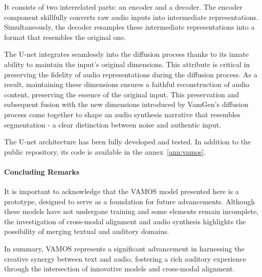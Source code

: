 It consists of two interrelated parts: an encoder and a decoder. The encoder component skillfully converts raw audio inputs into intermediate representations. Simultaneously, the decoder resamples these intermediate representations into a format that resembles the original one.

The U-net integrates seamlessly into the diffusion process thanks to its innate ability to maintain the input's original dimensions. This attribute is critical in preserving the fidelity of audio representations during the diffusion process. As a result, maintaining these dimensions ensures a faithful reconstruction of audio content, preserving the essence of the original input. This preservation and subsequent fusion with the new dimensions introduced by VamGen's diffusion process come together to shape an audio synthesis narrative that resembles segmentation - a clear distinction between noise and authentic input.

The U-net architecture has been fully developed and tested. In addition to the public repository, its code is available in the annex~\ref{ann:vamos}.

\paragraph{Concluding Remarks}

It is important to acknowledge that the VAMOS model presented here is a prototype, designed to serve as a foundation for future advancements. Although these models have not undergone training and some elements remain incomplete, the investigation of cross-modal alignment and audio synthesis highlights the possibility of merging textual and auditory domains.

In summary, VAMOS represents a significant advancement in harnessing the creative synergy between text and audio, fostering a rich auditory experience through the intersection of innovative models and cross-modal alignment.